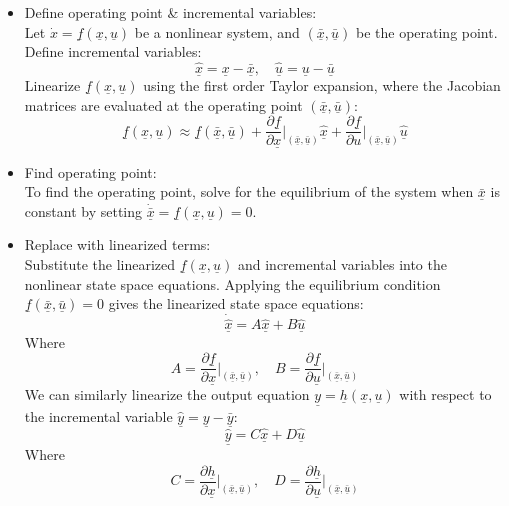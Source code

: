 ﻿\documentclass[12pt]{article}
\begin{document}
\begin{itemize}
    \item [I.] Define operating point \& incremental variables:\\
    Let $\dot{x} = \underline{f}(\underline{x},\underline{u})$ be a nonlinear system, and $(\underline{\bar{x}}, \underline{\bar{u}})$ be the operating point. Define incremental variables:
    \[\underline{\hat{x}} = \underline{x} - \underline{\bar{x}},\quad \underline{\hat{u}} = \underline{u} - \underline{\bar{u}}\]
    Linearize $\underline{f}(\underline{x},\underline{u})$ using the first order Taylor expansion, where the Jacobian matrices are evaluated at the operating point $(\underline{\bar{x}}, \underline{\bar{u}})$:
    \[\underline{f}(\underline{x},\underline{u}) \approx \underline{f}(\underline{\bar{x}}, \underline{\bar{u}}) + \frac{\partial \underline{f}}{\partial \underline{x}}\bigg|_{(\underline{\bar{x}}, \underline{\bar{u}})} \underline{\hat{x}} + \frac{\partial \underline{f}}{\partial u}\bigg|_{(\underline{\bar{x}}, \underline{\bar{u}})} \underline{\hat{u}}\]
    \item [II.] Find operating point:\\
    To find the operating point, solve for the equilibrium of the system when $\underline{\bar{x}}$ is constant by setting $\dot{\underline{\bar{x}}} = \underline{f}(\underline{x},\underline{u}) = 0$.
    \item [III.] Replace with linearized terms:\\
    Substitute the linearized $\underline{f}(\underline{x},\underline{u})$ and incremental variables into the nonlinear state space equations. Applying the equilibrium condition $\underline{f}(\underline{\bar{x}}, \underline{\bar{u}}) = 0$ gives the linearized state space equations:
    \[\dot{\underline{\hat{x}}} = A \underline{\hat{x}} + B \underline{\hat{u}}\]
    Where
    \[A = \frac{\partial \underline{f}}{\partial \underline{x}}\bigg|_{(\underline{\bar{x}}, \underline{\bar{u}})}, \quad B = \frac{\partial \underline{f}}{\partial \underline{u}}\bigg|_{(\underline{\bar{x}}, \underline{\bar{u}})}\]
    We can similarly linearize the output equation $\underline{y} = \underline{h}(\underline{x},\underline{u})$ with respect to the incremental variable $\underline{\hat{y}} = \underline{y} - \underline{\bar{y}}$:
    \[\underline{\hat{y}} = C \underline{\hat{x}} + D \underline{\hat{u}}\]
    Where
    \[C = \frac{\partial \underline{h}}{\partial \underline{x}}\bigg|_{(\underline{\bar{x}}, \underline{\bar{u}})}, \quad D = \frac{\partial \underline{h}}{\partial \underline{u}}\bigg|_{(\underline{\bar{x}}, \underline{\bar{u}})}\]
\end{itemize}
\end{document}
